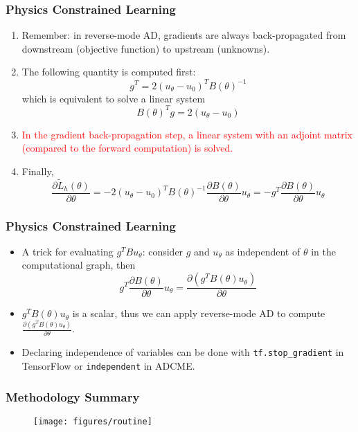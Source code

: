 \documentclass[usenames,dvipsnames]{beamer}
\begin{document}
\begin{frame}
	\frametitle{Physics Constrained Learning}
	
	\begin{enumerate}
		\item Remember: in reverse-mode AD, gradients are always back-propagated from downstream (objective function) to upstream (unknowns). 
		\item The following quantity is computed first:
		$$g^T = 2(u_\theta-u_0)^TB(\theta)^{-1}$$
		which is equivalent to solve a linear system 
		$$B(\theta)^T g = 2(u_\theta-u_0)$$
		\item \textcolor{red}{In the gradient back-propagation step, a linear system with an adjoint matrix (compared to the forward computation) is solved.} 
		\item Finally, 
		$$\frac{\partial \tilde L_h(\theta)}{\partial \theta} = -2(u_\theta-u_0)^TB(\theta)^{-1} \frac{\partial B(\theta)}{\partial \theta}u_\theta = -g^T \frac{\partial B(\theta)}{\partial \theta}u_\theta$$
	\end{enumerate}
\end{frame}



\begin{frame}
	\frametitle{Physics Constrained Learning}
	
	\begin{itemize}
		\item A trick for evaluating $g^T Bu_\theta$: consider $g$ and $u_\theta$ as independent of $\theta$ in the computational graph, then 
		$$g^T \frac{\partial B(\theta)}{\partial \theta}u_\theta = \frac{\partial (g^T B(\theta) u_\theta)}{\partial \theta}$$
		\item $g^T B(\theta) u_\theta$ is a scalar, thus we can apply reverse-mode AD to compute $\frac{\partial (g^T B(\theta) u_\theta)}{\partial \theta}$.
		\item Declaring independence of variables can be done with \texttt{tf.stop\_gradient} in TensorFlow or \texttt{independent} in ADCME. 
	\end{itemize}
\end{frame}




\begin{frame}
	\frametitle{Methodology Summary}
	\begin{figure}[hbt]
		\centering
		\texttt{[image: figures/routine]}
	\end{figure}

\end{frame}
\end{document}
